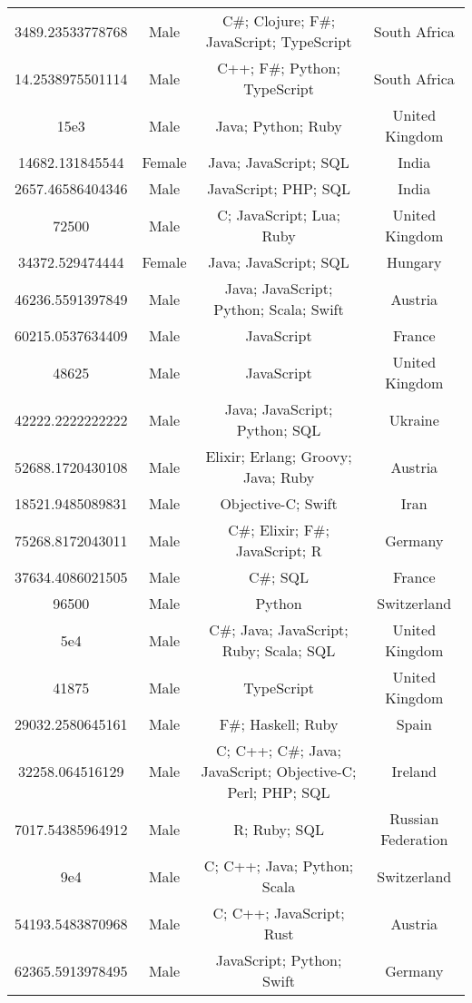 \begin{center}
\begin{tabular}{ |c|c|c|c| }
3489.23533778768  &  Male  &  C\#; Clojure; F\#; JavaScript; TypeScript  &  South Africa  \\ 
14.2538975501114  &  Male  &  C++; F\#; Python; TypeScript  &  South Africa  \\ 
15e3  &  Male  &  Java; Python; Ruby  &  United Kingdom  \\ 
14682.131845544  &  Female  &  Java; JavaScript; SQL  &  India  \\ 
2657.46586404346  &  Male  &  JavaScript; PHP; SQL  &  India  \\ 
72500  &  Male  &  C; JavaScript; Lua; Ruby  &  United Kingdom  \\ 
34372.529474444  &  Female  &  Java; JavaScript; SQL  &  Hungary  \\ 
46236.5591397849  &  Male  &  Java; JavaScript; Python; Scala; Swift  &  Austria  \\ 
60215.0537634409  &  Male  &  JavaScript  &  France  \\ 
48625  &  Male  &  JavaScript  &  United Kingdom  \\ 
42222.2222222222  &  Male  &  Java; JavaScript; Python; SQL  &  Ukraine  \\ 
52688.1720430108  &  Male  &  Elixir; Erlang; Groovy; Java; Ruby  &  Austria  \\ 
18521.9485089831  &  Male  &  Objective-C; Swift  &  Iran  \\ 
75268.8172043011  &  Male  &  C\#; Elixir; F\#; JavaScript; R  &  Germany  \\ 
37634.4086021505  &  Male  &  C\#; SQL  &  France  \\ 
96500  &  Male  &  Python  &  Switzerland  \\ 
5e4  &  Male  &  C\#; Java; JavaScript; Ruby; Scala; SQL  &  United Kingdom  \\ 
41875  &  Male  &  TypeScript  &  United Kingdom  \\ 
29032.2580645161  &  Male  &  F\#; Haskell; Ruby  &  Spain  \\ 
32258.064516129  &  Male  &  C; C++; C\#; Java; JavaScript; Objective-C; Perl; PHP; SQL  &  Ireland  \\ 
7017.54385964912  &  Male  &  R; Ruby; SQL  &  Russian Federation  \\ 
9e4  &  Male  &  C; C++; Java; Python; Scala  &  Switzerland  \\ 
54193.5483870968  &  Male  &  C; C++; JavaScript; Rust  &  Austria  \\ 
62365.5913978495  &  Male  &  JavaScript; Python; Swift  &  Germany  \\ 

\end{tabular}
\end{center}

